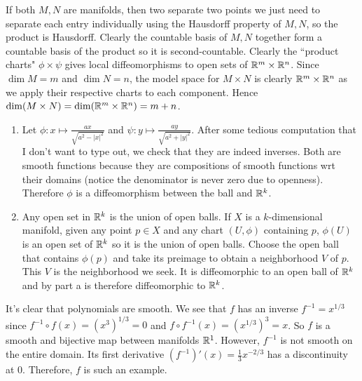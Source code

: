 \documentclass[12pt]{article}
\begin{document}
\begin{problem}[2.1.5.3]
If both $ M,N$ are manifolds, then two separate two points we just need to separate each entry individually using the Hausdorff property of  $ M,N$, so the product is Hausdorff. Clearly the countable basis of  $ M,N$ together form a countable basis of the product so it is second-countable. Clearly the ``product charts" $ \phi \times \psi$ gives local diffeomorphisms to open sets of $ \mathbb{R}^{m} \times \mathbb{R}^{n}$. Since $ \dim M = m$ and $\dim N = n$, the model space for $ M \times N$ is clearly $ \mathbb{R}^{m} \times \mathbb{R}^{n}$ as we apply their respective charts to each component. Hence $\dim (M \times N) = \dim (\mathbb{R}^{m}\times \mathbb{R}^{n}) = m+n$.
\end{problem}
\begin{problem}[1.4]
\begin{enumerate}[label=(\alph*)]
	\item Let $ \phi: x \mapsto \frac{ax}{ \sqrt{a^2-|x|^2} }$ and $ \psi: y \mapsto \frac{ay}{\sqrt{a^2+|y|^2} } $. After some tedious computation that I don't want to type out, we check that they are indeed inverses. Both are smooth functions because they are compositions of smooth functions wrt their domains (notice the denominator is never zero due to openness). Therefore $ \phi$ is a diffeomorphism between the ball and $ \mathbb{R}^{k}$.
	\item Any open set in $ \mathbb{R}^{k}$ is the union of open balls. If $ X$ is a  $ k$-dimensional manifold, given any point  $ p \in X$ and any chart $ (U, \phi)$ containing $ p$,  $ \phi(U)$ is an open set of $ \mathbb{R}^{k}$ so it is the union of open balls. Choose the open ball that contains $ \phi(p)$ and take its preimage to obtain a neighborhood $ V$ of $ p$. This $ V$ is the neighborhood we seek. It is diffeomorphic to an open ball of  $ \mathbb{R}^{k}$ and by part a is therefore diffeomorphic to $ \mathbb{R}^{k}$.
\end{enumerate}

\end{problem}
\begin{problem}[1.6]
It's clear that polynomials are smooth. We see that $ f$ has an inverse  $ f^{-1} = x^{1 /3}$ since $ f^{-1} \circ f (x) = (x^3)^{1 /3} = 0$ and $ f \circ f^{-1}(x) = (x^{1 /3})^{3} = x$. So $ f$ is a smooth and bijective map between manifolds $ \mathbb{R}^{1}$. However, $ f^{-1}$ is not smooth on the entire domain. Its first derivative $ (f^{-1})'(x) = \frac{1}{3} x^{-2 /3}$ has a discontinuity at $ 0$. Therefore,  $ f$ is such an example.
\end{problem}
\end{document}
